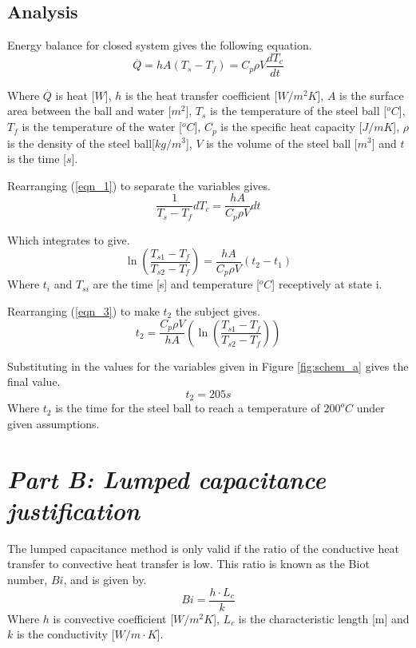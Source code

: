 \documentclass[11pt]{article}
\begin{document}
\subsection{Analysis}

Energy balance for closed system gives the following equation.
\begin{equation}\label{eqn_1}
	\stackrel{.}{Q} = hA(T_{s}-T_{f}) = C_{p}\rho V \frac{dT_{c}}{dt}
\end{equation}

Where $\stackrel{.}{Q}$ is heat [$W$], $h$ is the heat transfer coefficient [$W/m^{2}K$], $A$ is the surface area between the ball and water [$m^{2}$], $T_{s}$ is the temperature of the steel ball [$^{o}C$], $T_{f}$ is the temperature of the water [$^{o}C$], $C_{p}$ is the specific heat capacity [$J/mK$], $\rho$ is the density of the steel ball[$kg/m^{3}$], $V$ is the volume of the steel ball [$m^3$] and $t$ is the time [$s$].
\newline

Rearranging (\ref{eqn_1}) to separate the variables gives.
\begin{equation}\label{key}
	\frac{1}{T_{s}-T_{f}} dT_{c} = \frac{hA}{C_{p}\rho V}dt
\end{equation}

Which integrates to give.
\begin{equation}\label{eqn_3}
	\ln{(\frac{T_{s1}-T_{f}}{T_{s2}-T_{f}})} =  \frac{hA}{C_{p}\rho V}(t_{2}-t_{1})
\end{equation}
Where $t_{i}$ and $T_{si}$ are the time [s] and temperature [$^oC$] receptively at state i.

Rearranging (\ref{eqn_3}) to make $t_{2}$ the subject gives.
\begin{equation}\label{key}
	t_{2} = \frac{C_{p}\rho V}{hA}(\ln{(\frac{T_{s1}-T_{f}}{T_{s2}-T_{f}})})
\end{equation}

Substituting in the values for the variables given in Figure \ref{fig:schem_a} gives the final value.
\boldmath
\begin{equation}\label{t1}
	t_2 = 205 s
\end{equation}
\unboldmath
Where $t_2$ is the time for the steel ball to reach a temperature of $200^{o}C$ under given assumptions.

\section{\emph{Part B: Lumped capacitance justification}}
The lumped capacitance method is only valid if the ratio of the conductive heat transfer to convective heat transfer is low. This ratio is known as the Biot number, $Bi$, and is given by.
\begin{equation}\label{eqn_biot}
	Bi = \frac{h \cdot L_{c}}{k}
\end{equation}
Where $h$ is convective coefficient [$W/m^{2}K$], $L_{c}$ is the characteristic length [m] and $k$ is the conductivity [$W/m \cdot K$]. 
\end{document}
